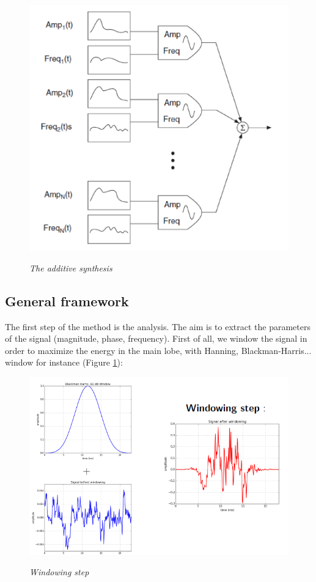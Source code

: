 \documentclass[]{article}
\begin{document}
\begin{figure}[H]
	\centering
	{\includegraphics[scale=0.4]{additif.png}}
	\caption{\it The additive synthesis}
\end{figure} 
\medskip

\subsection{General framework}\label{sec:general-framework}

\hspace{15pt}The first step of the method is the analysis. The aim is to extract the parameters of the signal (magnitude, phase, frequency).
First of all, we window the signal in order to maximize the energy in the main lobe, with Hanning, Blackman-Harris... window for instance (Figure \ref{windowing}):

\begin{figure}[H]
	\centering
	{\includegraphics[scale=0.4]{slide1.png}}
	\caption{\it Windowing step}
	\label{windowing}
\end{figure}
\end{document}
